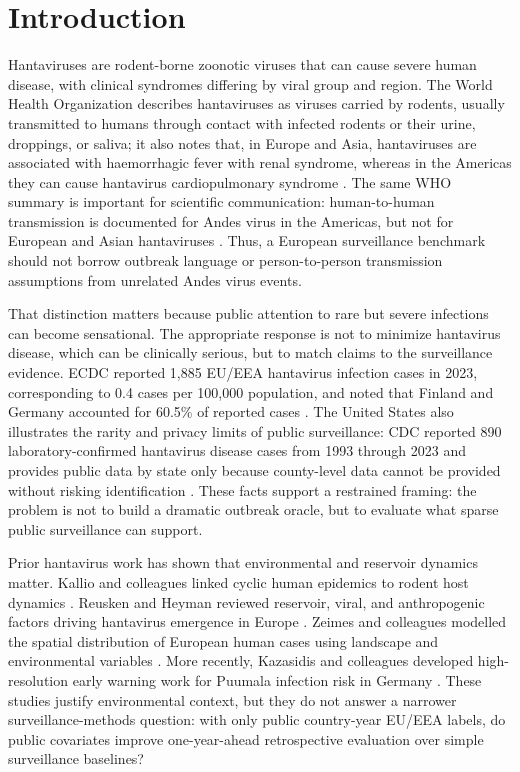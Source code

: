 \documentclass[11pt]{article}
\begin{document}
\section{Introduction}

Hantaviruses are rodent-borne zoonotic viruses that can cause severe human disease, with clinical syndromes differing by viral group and region. The World Health Organization describes hantaviruses as viruses carried by rodents, usually transmitted to humans through contact with infected rodents or their urine, droppings, or saliva; it also notes that, in Europe and Asia, hantaviruses are associated with haemorrhagic fever with renal syndrome, whereas in the Americas they can cause hantavirus cardiopulmonary syndrome \cite{who_hantavirus_2026}. The same WHO summary is important for scientific communication: human-to-human transmission is documented for Andes virus in the Americas, but not for European and Asian hantaviruses \cite{who_hantavirus_2026}. Thus, a European surveillance benchmark should not borrow outbreak language or person-to-person transmission assumptions from unrelated Andes virus events.

That distinction matters because public attention to rare but severe infections can become sensational. The appropriate response is not to minimize hantavirus disease, which can be clinically serious, but to match claims to the surveillance evidence. ECDC reported 1,885 EU/EEA hantavirus infection cases in 2023, corresponding to 0.4 cases per 100,000 population, and noted that Finland and Germany accounted for 60.5\% of reported cases \cite{ecdc_2023_hantavirus}. The United States also illustrates the rarity and privacy limits of public surveillance: CDC reported 890 laboratory-confirmed hantavirus disease cases from 1993 through 2023 and provides public data by state only because county-level data cannot be provided without risking identification \cite{cdc_cases_2026}. These facts support a restrained framing: the problem is not to build a dramatic outbreak oracle, but to evaluate what sparse public surveillance can support.

Prior hantavirus work has shown that environmental and reservoir dynamics matter. Kallio and colleagues linked cyclic human epidemics to rodent host dynamics \cite{kallio_2009}. Reusken and Heyman reviewed reservoir, viral, and anthropogenic factors driving hantavirus emergence in Europe \cite{reusken_heyman_2013}. Zeimes and colleagues modelled the spatial distribution of European human cases using landscape and environmental variables \cite{zeimes_2015}. More recently, Kazasidis and colleagues developed high-resolution early warning work for Puumala infection risk in Germany \cite{kazasidis_2024}. These studies justify environmental context, but they do not answer a narrower surveillance-methods question: with only public country-year EU/EEA labels, do public covariates improve one-year-ahead retrospective evaluation over simple surveillance baselines?
\end{document}
